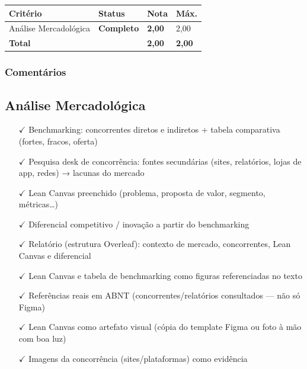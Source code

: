 \documentclass[
  sigconf,
  nonacm, %
  language=portuguese
]{acmart}
\newcommand{\statusok}[1]{{\small\bfseries\color{cgood}#1}}
\begin{document}
\begin{tabular}{@{} L{2.6cm} C{2.5cm} C{1.1cm} C{1.1cm} @{}}
\toprule
\textbf{Critério} & \textbf{Status} & \textbf{Nota} & \textbf{Máx.} \\
\midrule
Análise Mercadológica & \statusok{Completo} & \textbf{2,00} & 2,00 \\
\midrule
\textbf{Total} & & \textbf{\color{cred}2,00} & \textbf{2,00} \\
\bottomrule
\end{tabular}

\subsubsection*{Comentários}

\subsection{Análise Mercadológica}

\noindent\statusok{2,00\,/\,2,00 pts · Completo}

\begin{itemize}[leftmargin=14pt,itemsep=1pt,topsep=3pt,parsep=0pt]
  \item[\textcolor{cgood}{$\checkmark$}] {\small\textcolor{cgood}{Benchmarking: concorrentes diretos e indiretos + tabela comparativa (fortes, fracos, oferta)}}
  \item[\textcolor{cgood}{$\checkmark$}] {\small\textcolor{cgood}{Pesquisa desk de concorrência: fontes secundárias (sites, relatórios, lojas de app, redes) → lacunas do mercado}}
  \item[\textcolor{cgood}{$\checkmark$}] {\small\textcolor{cgood}{Lean Canvas preenchido (problema, proposta de valor, segmento, métricas…)}}
  \item[\textcolor{cgood}{$\checkmark$}] {\small\textcolor{cgood}{Diferencial competitivo / inovação a partir do benchmarking}}
  \item[\textcolor{cgood}{$\checkmark$}] {\small\textcolor{cgood}{Relatório (estrutura Overleaf): contexto de mercado, concorrentes, Lean Canvas e diferencial}}
  \item[\textcolor{cgood}{$\checkmark$}] {\small\textcolor{cgood}{Lean Canvas e tabela de benchmarking como figuras referenciadas no texto}}
  \item[\textcolor{cgood}{$\checkmark$}] {\small\textcolor{cgood}{Referências reais em ABNT (concorrentes/relatórios consultados — não só Figma)}}
  \item[\textcolor{cgood}{$\checkmark$}] {\small\textcolor{cgood}{Lean Canvas como artefato visual (cópia do template Figma ou foto à mão com boa luz)}}
  \item[\textcolor{cgood}{$\checkmark$}] {\small\textcolor{cgood}{Imagens da concorrência (sites/plataformas) como evidência}}
\end{itemize}
\end{document}
